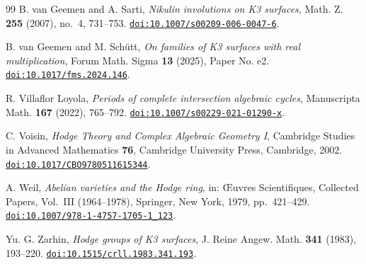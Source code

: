 \begin{thebibliography}{99}
B. van Geemen and A. Sarti,
\emph{Nikulin involutions on K3 surfaces},
Math. Z. \textbf{255} (2007), no.~4, 731--753.
\href{https://doi.org/10.1007/s00209-006-0047-6}{\nolinkurl{doi:10.1007/s00209-006-0047-6}}.

B. van Geemen and M. Sch\"utt,
\emph{On families of K3 surfaces with real multiplication},
Forum Math. Sigma \textbf{13} (2025), Paper No. e2.
\href{https://doi.org/10.1017/fms.2024.146}{\nolinkurl{doi:10.1017/fms.2024.146}}.

R. Villaflor Loyola,
\emph{Periods of complete intersection algebraic cycles},
Manuscripta Math. \textbf{167} (2022), 765--792.
\href{https://doi.org/10.1007/s00229-021-01290-x}{\nolinkurl{doi:10.1007/s00229-021-01290-x}}.

C. Voisin,
\emph{Hodge Theory and Complex Algebraic Geometry I},
Cambridge Studies in Advanced Mathematics \textbf{76},
Cambridge University Press, Cambridge, 2002.
\href{https://doi.org/10.1017/CBO9780511615344}{\nolinkurl{doi:10.1017/CBO9780511615344}}.

A. Weil,
\emph{Abelian varieties and the Hodge ring},
in: \OE uvres Scientifiques, Collected Papers, Vol.~III (1964--1978),
Springer, New York, 1979, pp.~421--429.
\href{https://doi.org/10.1007/978-1-4757-1705-1_123}{\nolinkurl{doi:10.1007/978-1-4757-1705-1_123}}.

Yu. G. Zarhin,
\emph{Hodge groups of K3 surfaces},
J. Reine Angew. Math. \textbf{341} (1983), 193--220.
\href{https://doi.org/10.1515/crll.1983.341.193}{\nolinkurl{doi:10.1515/crll.1983.341.193}}.

\end{thebibliography}
